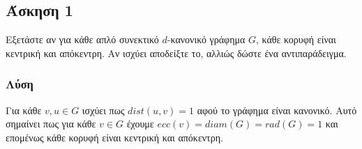 \subsection*{Άσκηση 1}

Εξετάστε αν για κάθε απλό συνεκτικό $d$-κανονικό γράφημα $G$, κάθε κορυφή είναι κεντρική
και απόκεντρη. Αν ισχύει αποδείξτε το, αλλιώς δώστε ένα αντιπαράδειγμα.

\subsubsection*{Λύση}

Για κάθε $v,u \in G$ ισχύει πως $dist(u,v) = 1$ αφού το γράφημα είναι κανονικό. 
Αυτό σημαίνει πως για κάθε $v \in G$ έχουμε $ecc(v) = diam(G) = rad(G) = 1$ και επομένως κάθε
κορυφή είναι κεντρική και απόκεντρη.
